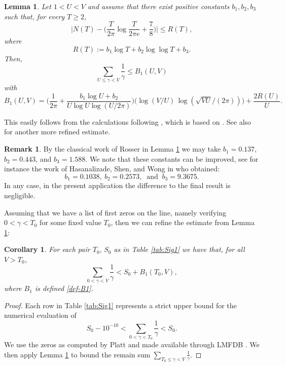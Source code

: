 \documentclass[10pt]{amsart}
\newtheorem{cor}[prop]{Corollary}
\newtheorem{lem}[prop]{Lemma}
\theoremstyle{definition}
\newtheorem{Rem}[prop]{Remark}
\numberwithin{equation}{section}
\begin{document}
\begin{lem}\label{b1Bnd}
Let $1 < U < V$ and assume that there exist positive constants $b_1,b_2,b_3$ such that, for every $T \geq 2$,
\[ \Big|N(T) - \Big(\frac{T}{2\pi}\log \frac{T}{2\pi e} + \frac78\Big) \Big| \le R(T),\]
where
\begin{equation*}
  \label{Rdefn}
R(T) := b_1 \log T + b_2 \log \log T + b_3.
\end{equation*}
Then,
\[
\sum_{ U \le \gamma <V  } \frac{1}{\gamma} 
\le B_1(U,V) 
\]
with
\begin{equation}
 \label{def-B1}
 B_1(U,V) = 
\Big(\frac{1}{2 \pi} + \frac{b_1 \log U + b_2}{U \log U \log(U/2 \pi)} \Big) \big( \log (V/U)\, \log (\sqrt{V U}/(2\pi)) \big)  + \frac{2R(U)}{U}.
\end{equation}
\end{lem}
This easily follows from the calculations following \cite[Corollary 2.6]{FabKad15}, which is based on \cite[Lemma 7]{RosserSchoenfeld2}. 
See also \cite[Lemma 3]{BrPlTr21} for another more refined estimate. 
\begin{Rem}
By the classical work of Rosser \cite[Theorem 19]{Rosser} in Lemma \ref{b1Bnd} we may take 
$b_1=0.137$, $b_2=0.443$, and $b_3=1.588$.
We note that these constants can be improved, see for instance the work of  Hasanalizade, Shen, and Wong in \cite{HSW21} who obtained:
\begin{equation}\label{def-ai}
b_1=0.1038,\ 
b_2=0.2573,\ \text{ and }\ 
b_3=9.3675.
\end{equation}
In any case, in the present application the difference to the final result is negligible.
\end{Rem}

%
Assuming that we have a list of first zeros on the line, namely verifying $0<\gamma<T_0$ for some fixed value $T_0$, then we can refine the estimate from Lemma \ref{b1Bnd}:
\begin{cor}\label{prop:SOTO}
For each pair $T_0,\,S_0$ as in Table \ref{tab:Sig1} we have that, for all $V> T_0$,
\begin{equation}
\sum_{ 0 < \gamma < V  } \frac{1}{\gamma} < S_0 + B_1(T_0,V),
\end{equation}
where $B_1$ is defined \eqref{def-B1}.
\end{cor}
%
\begin{proof}
Each row in Table \ref{tab:Sig1} represents a strict upper bound for the numerical evaluation of 
\begin{equation} \label{def:S0}   S_0 - 10^{-10} < \sum_{ 0< \gamma < T_0  } \frac{1}{\gamma}  < S_0 .\end{equation}
We use the zeros as computed by Platt  \cite{Pla17} and made available
through LMFDB \cite{LMFDB}. 
We then apply Lemma \ref{b1Bnd} to bound the remain sum $\sum_{ T_0 \le \gamma < V  } \frac{1}{\gamma}$.
\end{proof}
\end{document}
